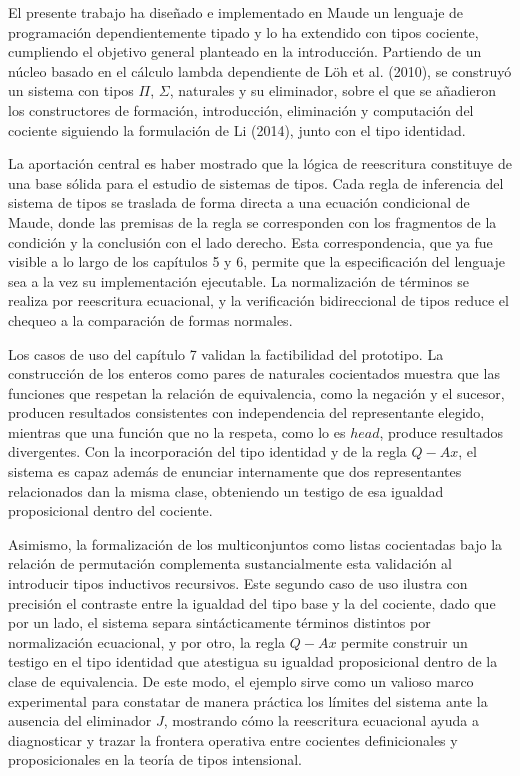 El presente trabajo ha diseñado e implementado en Maude un lenguaje de programación dependientemente tipado y lo ha extendido con tipos cociente, cumpliendo el objetivo general planteado en la introducción. Partiendo de un núcleo basado en el cálculo lambda dependiente de Löh et al. (2010), se construyó un sistema con tipos $\Pi$, $\Sigma$, naturales y su eliminador, sobre el que se añadieron los constructores de formación, introducción, eliminación y computación del cociente siguiendo la formulación de Li (2014), junto con el tipo identidad.

La aportación central es haber mostrado que la lógica de reescritura constituye de una base sólida para el estudio de sistemas de tipos. Cada regla de inferencia del sistema de tipos se traslada de forma directa a una ecuación condicional de Maude, donde las premisas de la regla se corresponden con los fragmentos de la condición y la conclusión con el lado derecho. Esta correspondencia, que ya fue visible a lo largo de los capítulos 5 y 6, permite que la especificación del lenguaje sea a la vez su implementación ejecutable. La normalización de términos se realiza por reescritura ecuacional, y la verificación bidireccional de tipos reduce el chequeo a la comparación de formas normales.

Los casos de uso del capítulo 7 validan la factibilidad del prototipo. La construcción de los enteros como pares de naturales cocientados muestra que las funciones que respetan la relación de equivalencia, como la negación y el sucesor, producen resultados consistentes con independencia del representante elegido, mientras que una función que no la respeta, como lo es $head$, produce resultados divergentes. Con la incorporación del tipo identidad y de la regla $Q-Ax$, el sistema es capaz además de enunciar internamente que dos representantes relacionados dan la misma clase, obteniendo un testigo de esa igualdad proposicional dentro del cociente.

Asimismo, la formalización de los multiconjuntos como listas cocientadas bajo la relación de permutación complementa sustancialmente esta validación al introducir tipos inductivos recursivos. Este segundo caso de uso ilustra con precisión el contraste entre la igualdad del tipo base y la del cociente, dado que por un lado, el sistema separa sintácticamente términos distintos por normalización ecuacional, y por otro, la regla $Q-Ax$ permite construir un testigo en el tipo identidad que atestigua su igualdad proposicional dentro de la clase de equivalencia. De este modo, el ejemplo sirve como un valioso marco experimental para constatar de manera práctica los límites del sistema ante la ausencia del eliminador $J$, mostrando cómo la reescritura ecuacional ayuda a diagnosticar y trazar la frontera operativa entre cocientes definicionales y proposicionales en la teoría de tipos intensional.

